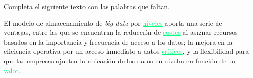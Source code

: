 
{
	Completa el siguiente texto con las palabras que faltan.
}\\

\begin{solution}
	El modelo de almacenamiento de \textit{big data} por \textcolor{springGreen}{\underline{niveles}} aporta una serie de ventajas, entre las que se encuentran la reducción de \textcolor{springGreen}{\underline{costes}} al asignar recursos basados en la importancia y frecuencia de acceso a los datos; la mejora en la eficiencia operativa por un acceso inmediato a datos \textcolor{springGreen}{\underline{críticos}}, y la flexibilidad para que las empresas ajusten la ubicación de los datos en niveles en función de su \textcolor{springGreen}{\underline{valor}}.
\end{solution}
